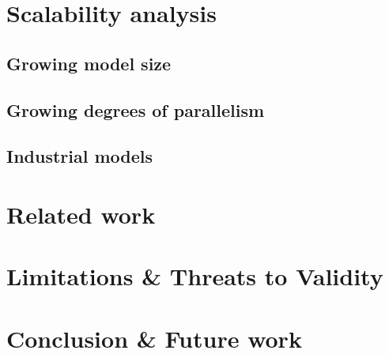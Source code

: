 \documentclass[runningheads]{llncs}
\begin{document}
\section{Scalability analysis}

\subsection{Growing model size}

\subsection{Growing degrees of parallelism}

\subsection{Industrial models}

\section{Related work}


\cite{krauterFormalizationAnalysisBPMN2023} %

\cite{vangorpVisualTokenbasedFormalization2013}

\cite{corradiniBProVeToolSupport2017,corradiniFormalApproachAnalysis2021}

\section{Limitations \& Threats to Validity}

\section{Conclusion \& Future work}

 

\end{document}
